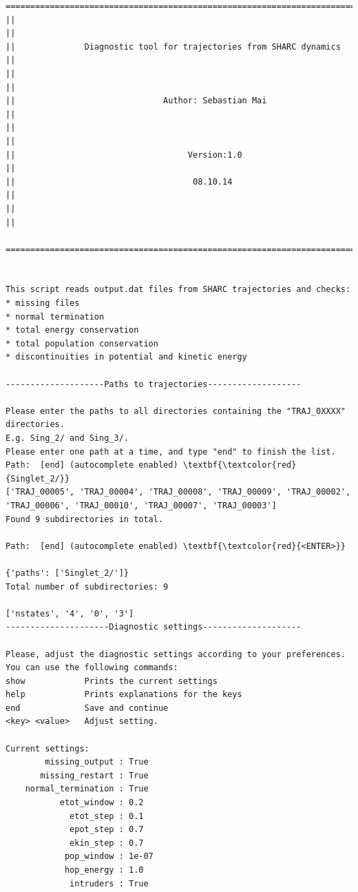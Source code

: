 \documentclass[a4paper,11pt,DIV=15,openany]{scrbook}
\begin{document}
\begin{oframed}
\footnotesize\begin{Verbatim}[commandchars=\\\{\}]
  ================================================================================
||                                                                                ||
||              Diagnostic tool for trajectories from SHARC dynamics              ||
||                                                                                ||
||                              Author: Sebastian Mai                             ||
||                                                                                ||
||                                   Version:1.0                                  ||
||                                    08.10.14                                    ||
||                                                                                ||
  ================================================================================


This script reads output.dat files from SHARC trajectories and checks:
* missing files
* normal termination
* total energy conservation
* total population conservation
* discontinuities in potential and kinetic energy
  
--------------------Paths to trajectories-------------------

Please enter the paths to all directories containing the "TRAJ_0XXXX" directories.
E.g. Sing_2/ and Sing_3/. 
Please enter one path at a time, and type "end" to finish the list.
Path:  [end] (autocomplete enabled) \textbf{\textcolor{red}{Singlet_2/}}
['TRAJ_00005', 'TRAJ_00004', 'TRAJ_00008', 'TRAJ_00009', 'TRAJ_00002', 
'TRAJ_00006', 'TRAJ_00010', 'TRAJ_00007', 'TRAJ_00003']
Found 9 subdirectories in total.

Path:  [end] (autocomplete enabled) \textbf{\textcolor{red}{<ENTER>}}

{'paths': ['Singlet_2/']}
Total number of subdirectories: 9

['nstates', '4', '0', '3']
---------------------Diagnostic settings--------------------

Please, adjust the diagnostic settings according to your preferences.
You can use the following commands:
show            Prints the current settings
help            Prints explanations for the keys
end             Save and continue
<key> <value>   Adjust setting.

Current settings:
        missing_output : True
       missing_restart : True
    normal_termination : True
           etot_window : 0.2
             etot_step : 0.1
             epot_step : 0.7
             ekin_step : 0.7
            pop_window : 1e-07
            hop_energy : 1.0
             intruders : True


\end{Verbatim}
\end{oframed}
\end{document}
